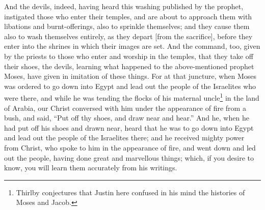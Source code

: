 
And the devils, indeed, having heard this washing published by the prophet, instigated  those who enter their temples, and are about to approach them with libations and burnt-offerings, also to sprinkle themselves; and they cause them also to wash themselves entirely, as they depart [from the sacrifice], before they enter into the shrines in which their images are set. And the command, too, given by the priests to those who enter and worship in the temples, that they take off their shoes, the devils, learning what happened to the above-mentioned prophet Moses, have given in imitation of these things. For at that juncture, when Moses was ordered to go down into Egypt and lead out the people of the Israelites who were there, and while he was tending the flocks of his maternal uncle\footnote{Thirlby conjectures that Justin here confused in his mind the histories of Moses and Jacob.} in the land of Arabia, our Christ conversed with him under the appearance of fire from a bush, and said, “Put off thy shoes, and draw near and hear.” And he, when he had put off his shoes and drawn near, heard that he was to go down into Egypt and lead out the people of the Israelites there; and he received mighty power from Christ, who spoke to him in the appearance of fire, and went down and led out the people, having done great and marvellous things; which, if you desire to know, you will learn them accurately from his writings.


